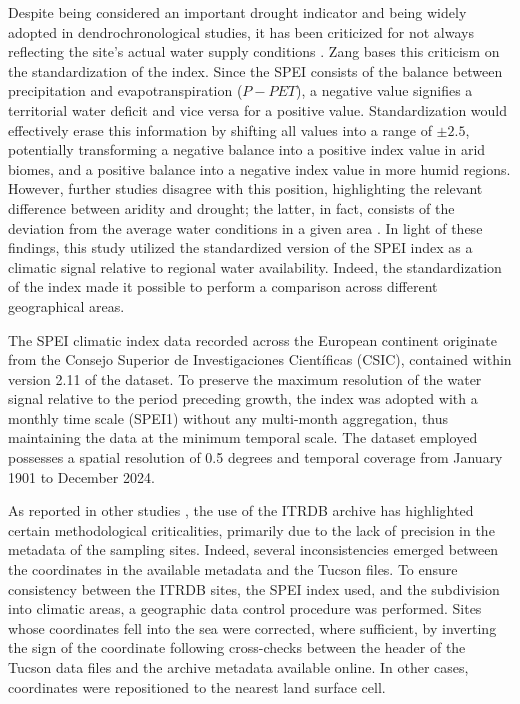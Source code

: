 \documentclass[12pt, a4paper]{article}
\begin{document}
Despite being considered an important drought indicator and being widely adopted in dendrochronological studies, it has been criticized for not always reflecting the site's actual water supply conditions \parencite{zang2020}. Zang bases this criticism on the standardization of the index. Since the SPEI consists of the balance between precipitation and evapotranspiration ($P - PET$), a negative value signifies a territorial water deficit and vice versa for a positive value. Standardization would effectively erase this information by shifting all values into a range of $\pm 2.5$, potentially transforming a negative balance into a positive index value in arid biomes, and a positive balance into a negative index value in more humid regions. However, further studies disagree with this position, highlighting the relevant difference between aridity and drought; the latter, in fact, consists of the deviation from the average water conditions in a given area \parencite{slette2020}. In light of these findings, this study utilized the standardized version of the SPEI index as a climatic signal relative to regional water availability. Indeed, the standardization of the index made it possible to perform a comparison across different geographical areas.

The SPEI climatic index data recorded across the European continent originate from the Consejo Superior de Investigaciones Científicas (CSIC), contained within version 2.11 of the dataset. To preserve the maximum resolution of the water signal relative to the period preceding growth, the index was adopted with a monthly time scale (SPEI1) without any multi-month aggregation, thus maintaining the data at the minimum temporal scale. The dataset employed possesses a spatial resolution of 0.5 degrees and temporal coverage from January 1901 to December 2024.

As reported in other studies \parencite{jeong2021, bowman2013}, the use of the ITRDB archive has highlighted certain methodological criticalities, primarily due to the lack of precision in the metadata of the sampling sites. Indeed, several inconsistencies emerged between the coordinates in the available metadata and the Tucson files. To ensure consistency between the ITRDB sites, the SPEI index used, and the subdivision into climatic areas, a geographic data control procedure was performed. Sites whose coordinates fell into the sea were corrected, where sufficient, by inverting the sign of the coordinate following cross-checks between the header of the Tucson data files and the archive metadata available online. In other cases, coordinates were repositioned to the nearest land surface cell.
\end{document}
